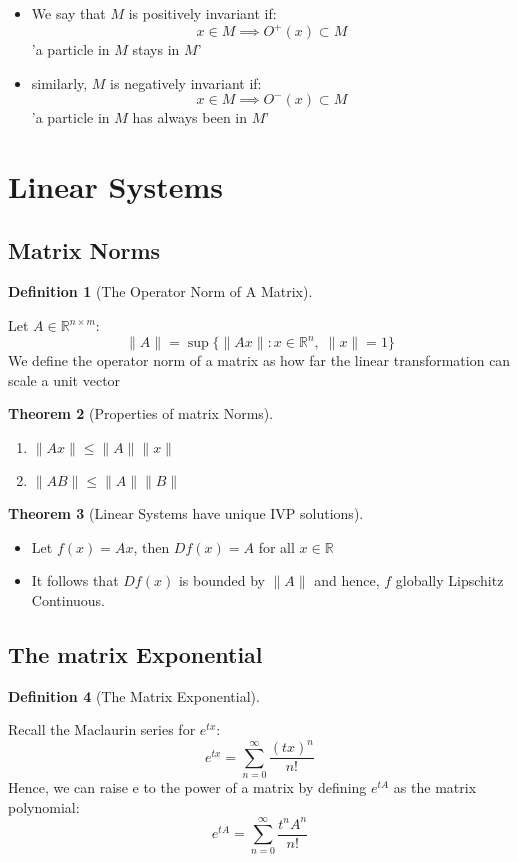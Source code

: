 \documentclass{article}
\newtheorem{thm}{Theorem}[section]
\newtheorem{defn}[thm]{Definition}
\begin{document}
\begin{itemize}
    \item We say that $M$ is positively invariant if:
    \[x \in M \implies O^+(x) \subset M\]
    'a particle in $M$ stays in $M$'
    \item similarly, $M$ is negatively invariant if:
    \[x \in M \implies O^-(x) \subset M\]
    'a particle in $M$ has always been in $M$'
\end{itemize}

\newpage
\section{Linear Systems}
\subsection{Matrix Norms}
\begin{defn}[The Operator Norm of A Matrix]
\end{defn}
Let $A \in \mathbb{R}^{n\times m}$:
\[ \|A\| = \sup \{\| Ax\|: x \in \mathbb{R}^n,\;\|x\| = 1\}\]
We define the operator norm of a matrix as how far the linear transformation can scale a unit vector
\begin{thm}[Properties of matrix Norms]\end{thm}
    \begin{enumerate}
        \item $\|Ax\| \leq \|A\| \|x\|$
         \item $\|AB\| \leq \|A\| \|B\|$
    \end{enumerate}

\begin{thm}[Linear Systems have unique IVP solutions]
\end{thm}
\begin{itemize}
    \item Let $f(x) = Ax$, then $Df(x) = A$ for all $x \in \mathbb{R}$
    \item It follows that $Df(x)$ is bounded by $\|A\|$ and hence, $f$ globally Lipschitz Continuous.
\end{itemize}

\subsection{The matrix Exponential}
\begin{defn}[The Matrix Exponential]\end{defn}
Recall the Maclaurin series for $e^{tx}$:
\[e^{tx} = \sum_{n = 0}^\infty \frac{(tx)^n}{n!}\]
Hence, we can raise e to the power of a matrix by defining $e^{tA}$ as the matrix polynomial:
\[e^{tA} = \sum_{n = 0}^\infty \frac{t^nA^n}{n!}\]
\end{document}
